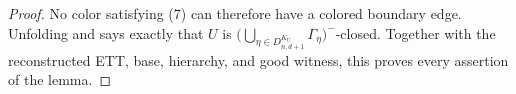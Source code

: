 \begin{proof}
No color satisfying (7) can therefore have a colored boundary edge.
Unfolding  and
 says exactly that $U$ is
$\bigl(\bigcup_{\eta\in D^{K_U}_{n,d+1}}\Gamma_\eta\bigr)^-$-closed.
Together with the reconstructed ETT, base, hierarchy, and good witness,
this proves every assertion of the lemma.
\end{proof}
